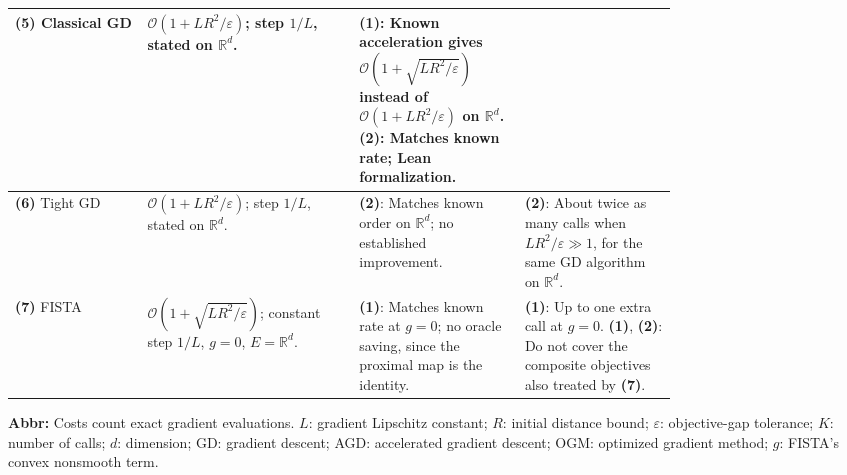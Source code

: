 \begin{table}[tp]
\begin{threeparttable}
\begin{tabularx}{\linewidth}{@{}>{\raggedright\arraybackslash}p{0.20\linewidth}>{\raggedright\arraybackslash}p{0.32\linewidth}>{\raggedright\arraybackslash}p{0.25\linewidth}>{\raggedright\arraybackslash}X@{}}
\midrule
\textbf{(5)} Classical GD \citep[Eq.~(3.1)]{scDroriTeboulle2012v1} & $\mathcal{O}(1+LR^2/\varepsilon)$; step $1/L$, stated on $\mathbb R^d$. & \textbf{(1)}: Known acceleration gives $\mathcal{O}(1+\sqrt{LR^2/\varepsilon})$ instead of $\mathcal{O}(1+LR^2/\varepsilon)$ on $\mathbb R^d$. \textbf{(2)}: Matches known rate; Lean formalization. & \\
\midrule
\textbf{(6)} Tight GD \citep[Thms.~3.1--3.2]{scDroriTeboulle2012v1} & $\mathcal{O}(1+LR^2/\varepsilon)$; step $1/L$, stated on $\mathbb R^d$. & \textbf{(2)}: Matches known order on $\mathbb R^d$; no established improvement. & \textbf{(2)}: About twice as many calls when $LR^2/\varepsilon\gg1$, for the same GD algorithm on $\mathbb R^d$. \\
\midrule
\textbf{(7)} FISTA \citep[Thm.~4.4]{ifsBeckTeboulle2009} & $\mathcal{O}\!\left(1+\sqrt{LR^2/\varepsilon}\right)$; constant step $1/L$, $g=0$, $E=\mathbb R^d$. & \textbf{(1)}: Matches known rate at $g=0$; no oracle saving, since the proximal map is the identity. & \textbf{(1)}: Up to one extra call at $g=0$. \textbf{(1)}, \textbf{(2)}: Do not cover the composite objectives also treated by \textbf{(7)}. \\
\bottomrule
\end{tabularx}
\begin{tablenotes}[flushleft]\footnotesize
\item[] \textbf{Abbr:} Costs count exact gradient evaluations. $L$: gradient Lipschitz constant; $R$: initial distance bound; $\varepsilon$: objective-gap tolerance; $K$: number of calls; $d$: dimension; GD: gradient descent; AGD: accelerated gradient descent; OGM: optimized gradient method; $g$: FISTA's convex nonsmooth term.
\end{tablenotes}
\end{threeparttable}
\end{table}
\clearpage
